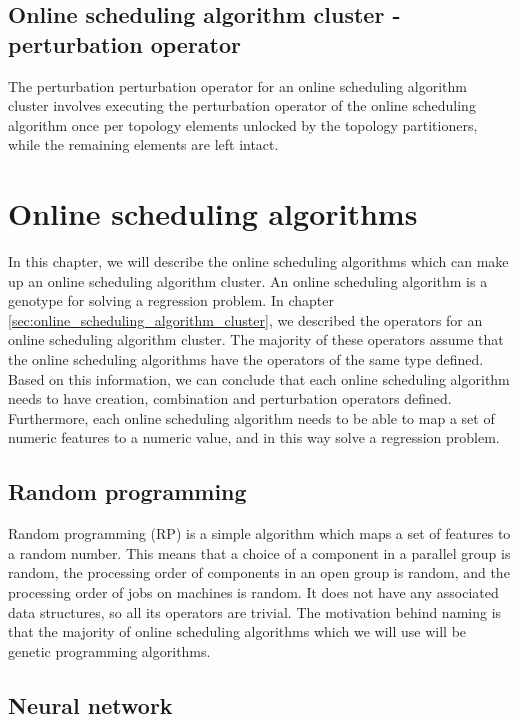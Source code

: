 \subsection{Online scheduling algorithm cluster - perturbation operator}
The perturbation perturbation operator for an online scheduling algorithm cluster involves executing the perturbation operator of the online scheduling algorithm once per topology elements unlocked by the topology partitioners, while the remaining elements are left intact.

\section{Online scheduling algorithms}
\label{sec:online_scheduling_algorithms}

In this chapter, we will describe the online scheduling algorithms which can make up an online scheduling algorithm cluster. An online scheduling algorithm is a genotype for solving a regression problem. In chapter \ref{sec:online_scheduling_algorithm_cluster}, we described the operators for an online scheduling algorithm cluster. The majority of these operators assume that the online scheduling algorithms have the operators of the same type defined. Based on this information, we can conclude that each online scheduling algorithm needs to have creation, combination and perturbation operators defined. Furthermore, each online scheduling algorithm needs to be able to map a set of numeric features to a numeric value, and in this way solve a regression problem.

\subsection{Random programming}

Random programming (RP) is a simple algorithm which maps a set of features to a random number. This means that a choice of a component in a parallel group is random, the processing order of components in an open group is random, and the processing order of jobs on machines is random. It does not have any associated data structures, so all its operators are trivial. The motivation behind naming is that the majority of online scheduling algorithms which we will use will be genetic programming algorithms.

\subsection{Neural network}

